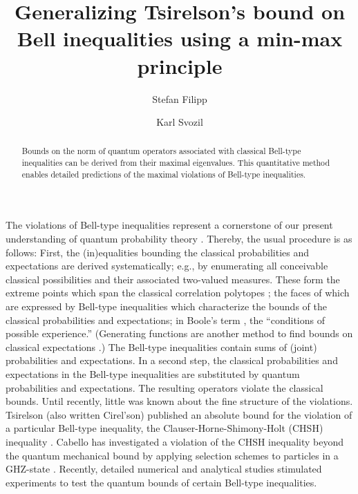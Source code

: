 \documentclass[pra,showpacs,showkeys,amsfonts,amsmath]{revtex4}
\begin{document}
\title{Generalizing {T}sirelson's bound on {B}ell inequalities using a min-max principle}

\author{Stefan Filipp}
\author{Karl Svozil}


\begin{abstract}
Bounds on the norm of quantum operators associated with classical Bell-type inequalities
can be derived from their maximal eigenvalues.
This quantitative method enables detailed
predictions of the maximal violations of Bell-type inequalities.
\end{abstract}


\maketitle

The violations of Bell-type inequalities represent
a cornerstone of our present understanding of quantum probability theory
\cite{peres}.
Thereby, the usual procedure is as follows:
First, the (in)equalities bounding the classical probabilities and expectations are
derived systematically; e.g., by enumerating all conceivable classical possibilities
and their associated two-valued measures.
These form the extreme points which span
the classical correlation polytopes
\cite{cirelson:80,cirelson,froissart-81,pitowsky-86,pitowsky,pitowsky-89a,Pit-91,Pit-94,2000-poly,collins-gisin-2003,sliwa-2003};
the faces of which are expressed by Bell-type inequalities
which characterize the bounds of the classical probabilities and expectations;
in Boole's term \cite{Boole,Boole-62}, the ``conditions of possible experience.''
(Generating functions are another method to find bounds on classical expectations \cite{werner-wolf-2001,schachner-2003}.)
The Bell-type inequalities contain sums of (joint) probabilities and expectations.
In a second step, the classical probabilities and expectations in
the Bell-type inequalities are substituted by quantum probabilities and expectations.
The resulting operators violate the classical bounds.
Until recently, little was known about the fine structure of the violations.
{T}sirelson (also written Cirel'son) published an absolute bound for the violation of a particular Bell-type inequality,
the Clauser-Horne-Shimony-Holt (CHSH) inequality \cite{cirelson:80,cirelson:87,cirelson,khalfin-97}.
Cabello has investigated a violation of the CHSH inequality beyond the quantum mechanical
bound by applying selection schemes to particles in a GHZ-state
\cite{cabello-02a,cabello-02b}.
Recently, detailed numerical  \cite{filipp-svo-04-qpoly}
and analytical studies \cite{cabello-2003a} stimulated
experiments \cite{bovino-2003} to test the quantum bounds of certain Bell-type inequalities.
\end{document}

